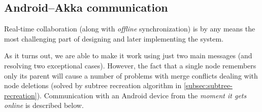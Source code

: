 %
%
%
%
%

\subsection{Android--Akka communication}
\label{subsec:android-akka-comm}


Real-time collaboration (along with \emph{offline} synchronization) is by any means the most challenging part of designing and later implementing the system.

As it turns out, we are able to make it work using just two main messages (and resolving two exceptional cases). However, the fact that a single node remembers only its parent will cause a number of problems with merge conflicts dealing with node deletions (solved by subtree recreation algorithm in \cref{subsec:subtree-recreation}). Communication with an Android device from the \emph{moment it gets online} is described below.

